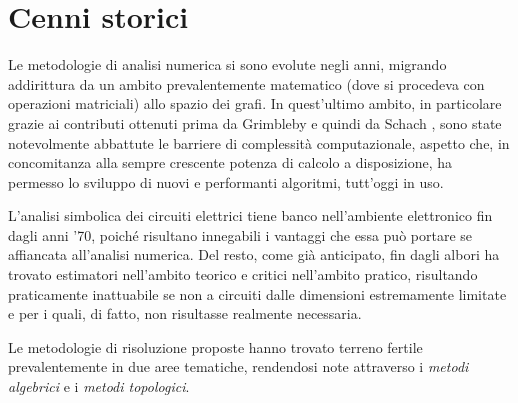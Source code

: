 \section{Cenni storici}

Le metodologie di analisi numerica si sono evolute negli anni, migrando addirittura da un ambito prevalentemente matematico (dove si procedeva con operazioni matriciali) allo spazio dei grafi. In quest'ultimo ambito, in particolare grazie ai contributi ottenuti prima da Grimbleby \cite{Grimbleby} e quindi da Schach \cite{MRT}, sono state notevolmente abbattute le barriere di complessità computazionale, aspetto che, in concomitanza alla sempre crescente potenza di calcolo a disposizione, ha permesso lo sviluppo di nuovi e performanti algoritmi, tutt'oggi in uso.

L'analisi simbolica dei circuiti elettrici tiene banco nell'ambiente elettronico fin dagli anni '70, poiché risultano innegabili i vantaggi che essa può portare se affiancata all'analisi numerica. Del resto, come già anticipato, fin dagli albori ha trovato estimatori nell'ambito teorico e critici nell'ambito pratico, risultando praticamente inattuabile se non a circuiti dalle dimensioni estremamente limitate e per i quali, di fatto, non risultasse realmente necessaria.

Le metodologie di risoluzione proposte hanno trovato terreno fertile prevalentemente in due aree tematiche, rendendosi note attraverso i \textit{metodi algebrici} e i \textit{metodi topologici}.

